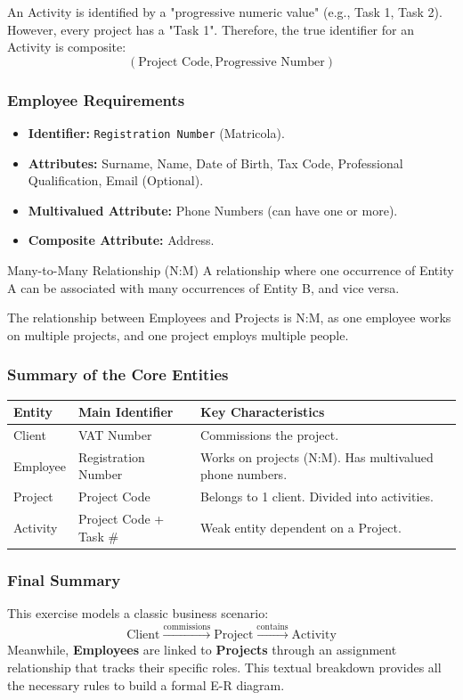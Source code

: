 An Activity is identified by a "progressive numeric value" (e.g., Task 1, Task 2). However, every project has a "Task 1". Therefore, the true identifier for an Activity is composite:
$$(\text{Project Code}, \text{Progressive Number})$$

\subsubsection{Employee Requirements}

\begin{itemize}
    \item \textbf{Identifier:} \texttt{Registration Number} (Matricola).
    \item \textbf{Attributes:} Surname, Name, Date of Birth, Tax Code, Professional Qualification, Email (Optional).
    \item \textbf{Multivalued Attribute:} Phone Numbers (can have one or more).
    \item \textbf{Composite Attribute:} Address.
\end{itemize}

\begin{defbox}{Many-to-Many Relationship (N:M)}
A relationship where one occurrence of Entity A can be associated with many occurrences of Entity B, and vice versa. 
\end{defbox}

The relationship between Employees and Projects is N:M, as one employee works on multiple projects, and one project employs multiple people.

\subsubsection{Summary of the Core Entities}

\begin{center}
\begin{tabular}{|l|l|l|}
\hline
\textbf{Entity} & \textbf{Main Identifier} & \textbf{Key Characteristics} \\
\hline
Client & VAT Number & Commissions the project. \\
Employee & Registration Number & Works on projects (N:M). Has multivalued phone numbers. \\
Project & Project Code & Belongs to 1 client. Divided into activities. \\
Activity & Project Code + Task \# & Weak entity dependent on a Project. \\
\hline
\end{tabular}
\end{center}

\subsubsection{Final Summary}
This exercise models a classic business scenario:
$$\text{Client} \xrightarrow{\text{commissions}} \text{Project} \xrightarrow{\text{contains}} \text{Activity}$$
Meanwhile, \textbf{Employees} are linked to \textbf{Projects} through an assignment relationship that tracks their specific roles. This textual breakdown provides all the necessary rules to build a formal E-R diagram.